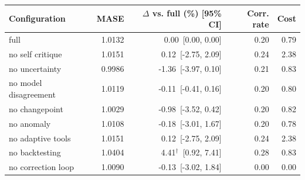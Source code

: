 \begin{tabular}{lrrrr}
\toprule
Configuration & MASE & $\Delta$ vs. full (\%) [95\% CI] & Corr. rate & Cost \\
\midrule
full & 1.0132 & 0.00~[0.00, 0.00] & 0.20 & 0.79 \\
no self critique & 1.0151 & 0.12~[-2.75, 2.09] & 0.24 & 2.38 \\
no uncertainty & 0.9986 & -1.36~[-3.97, 0.10] & 0.21 & 0.83 \\
no model disagreement & 1.0119 & -0.11~[-0.41, 0.16] & 0.20 & 0.80 \\
no changepoint & 1.0029 & -0.98~[-3.52, 0.42] & 0.20 & 0.82 \\
no anomaly & 1.0108 & -0.18~[-3.01, 1.67] & 0.20 & 0.78 \\
no adaptive tools & 1.0151 & 0.12~[-2.75, 2.09] & 0.24 & 2.38 \\
no backtesting & 1.0404 & 4.41$^\dagger$~[0.92, 7.41] & 0.28 & 0.83 \\
no correction loop & 1.0090 & -0.13~[-3.02, 1.84] & 0.00 & 0.00 \\
\bottomrule
\end{tabular}
